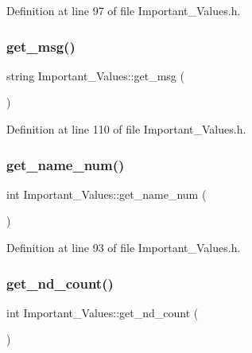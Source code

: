 Definition at line 97 of file Important\+\_\+\+Values.\+h.

\mbox{\label{class_important___values_ade0907e6ded362197bb98df4b5288487}} 
\subsubsection{\texorpdfstring{get\_msg()}{get\_msg()}}
{\footnotesize\ttfamily string Important\+\_\+\+Values\+::get\+\_\+msg (\begin{DoxyParamCaption}{ }\end{DoxyParamCaption})\hspace{0.3cm}{\ttfamily [inline]}}



Definition at line 110 of file Important\+\_\+\+Values.\+h.

\mbox{\label{class_important___values_aafd74fdbadfb3d603eb4704df290df9d}} 
\subsubsection{\texorpdfstring{get\_name\_num()}{get\_name\_num()}}
{\footnotesize\ttfamily int Important\+\_\+\+Values\+::get\+\_\+name\+\_\+num (\begin{DoxyParamCaption}{ }\end{DoxyParamCaption})\hspace{0.3cm}{\ttfamily [inline]}}



Definition at line 93 of file Important\+\_\+\+Values.\+h.

\mbox{\label{class_important___values_a3b18d0fc91d626e5497a24eb4264cdc3}} 
\subsubsection{\texorpdfstring{get\_nd\_count()}{get\_nd\_count()}}
{\footnotesize\ttfamily int Important\+\_\+\+Values\+::get\+\_\+nd\+\_\+count (\begin{DoxyParamCaption}{ }\end{DoxyParamCaption})\hspace{0.3cm}{\ttfamily [inline]}}



